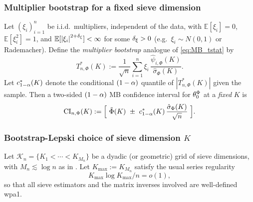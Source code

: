 \documentclass[12pt,american]{article}
\theoremstyle{definition}
\theoremstyle{plain}
\theoremstyle{definition}
\theoremstyle{plain}
\theoremstyle{plain}
\theoremstyle{plain}
\theoremstyle{plain}
\theoremstyle{plain}
\newcommand{\E}{\mathbb{E}}
\newcommand{\abs}[1]{\left| #1 \right|}
\begin{document}
\subsubsection*{Multiplier bootstrap for a fixed sieve dimension}

Let $(\xi_i)_{i=1}^n$ be i.i.d.\ multipliers, independent of the data, with
$\E[\xi_i]=0$, $\E[\xi_i^2]=1$, and $\E[\abs{\xi_i}^{2+\d_\xi}]<\infty$ for some $\delta_\xi>0$
(e.g.\ $\xi_i\sim N(0,1)$ or Rademacher).
Define the \emph{multiplier bootstrap} analogue of \eqref{eq:MB_tstat} by
\begin{equation}
  T_{n,\Phi}^*(K)
  :=\frac{1}{\sqrt n}\sum_{i=1}^n \xi_i\,\frac{\hat\psi_{i,\Phi}(K)}{\hat\sigma_{\Phi}(K)}.
  \label{eq:MB_tstat_star}
\end{equation}
Let $c_{1-\alpha}^*(K)$ denote the conditional $(1-\alpha)$ quantile of $\abs{T_{n,\Phi}^*(K)}$ given the sample.
Then a two-sided $(1-\alpha)$ MB confidence interval for $\theta_0^{\Phi}$ at a \emph{fixed} $K$ is
\begin{equation}
  \mathrm{CI}_{n,\Phi}(K)
  :=\Big[\ \tilde{\Phi}(K)\ \pm\ c_{1-\a}^*(K)\,\frac{\hat\sigma_{\Phi}(K)}{\sqrt n}\ \Big].
  \label{eq:MB_CI_fixedK}
\end{equation}

\subsubsection*{Bootstrap-Lepski choice of sieve dimension $K$}

Let $\mathcal K_n=\{K_1<\cdots<K_{M_n}\}$ be a dyadic (or geometric) grid of sieve dimensions,
with $M_n\lesssim\log n$ as in \citet*{chen2025adaptive}.
Let $K_{\max}:=K_{M_n}$ satisfy the usual series regularity
\begin{equation}
  K_{\max}\log K_{\max}/n=o(1),
  \label{eq:MB_Kmax_growth}
\end{equation}
so that all sieve estimators and the matrix inverses involved are well-defined wpa1.
\end{document}
